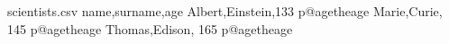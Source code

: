 \makeatletter
\def\printandsetlabel#1#2#3{#2\setcounter{#1}{#2}%
 \protected@edef\@currentlabel
 {\csname p@#1\endcsname\csname the#1\endcsname}%
 \label{#3}}
\makeatother

\newcommand*{\age}[2]{\printandsetlabel{age}{#1}{#2}}
\usepackage{pgfplotstable}
\pgfplotsset{compat=1.7}

\begin{filecontents*}{scientists.csv}
name,surname,age
Albert,Einstein,\age{133}{albert}
Marie,Curie,    \age{145}{marie}
Thomas,Edison,  \age{165}{thomas}
\end{filecontents*}